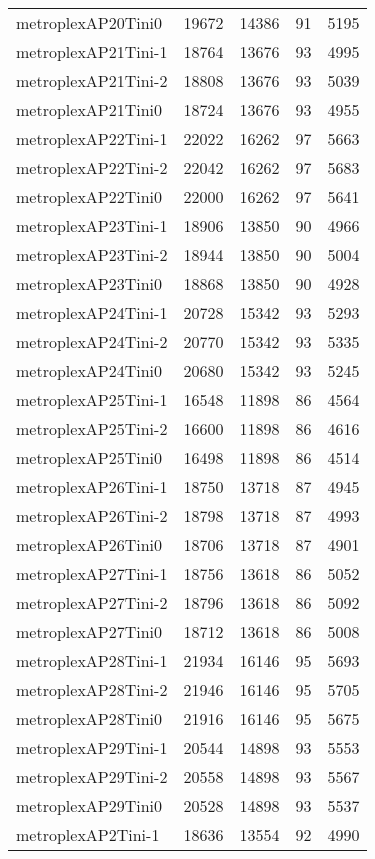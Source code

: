 \begin{tabular}{lrrrr}
metroplexAP20Tini0 & 19672 & 14386 & 91 & 5195 \\
metroplexAP21Tini-1 & 18764 & 13676 & 93 & 4995 \\
metroplexAP21Tini-2 & 18808 & 13676 & 93 & 5039 \\
metroplexAP21Tini0 & 18724 & 13676 & 93 & 4955 \\
metroplexAP22Tini-1 & 22022 & 16262 & 97 & 5663 \\
metroplexAP22Tini-2 & 22042 & 16262 & 97 & 5683 \\
metroplexAP22Tini0 & 22000 & 16262 & 97 & 5641 \\
metroplexAP23Tini-1 & 18906 & 13850 & 90 & 4966 \\
metroplexAP23Tini-2 & 18944 & 13850 & 90 & 5004 \\
metroplexAP23Tini0 & 18868 & 13850 & 90 & 4928 \\
metroplexAP24Tini-1 & 20728 & 15342 & 93 & 5293 \\
metroplexAP24Tini-2 & 20770 & 15342 & 93 & 5335 \\
metroplexAP24Tini0 & 20680 & 15342 & 93 & 5245 \\
metroplexAP25Tini-1 & 16548 & 11898 & 86 & 4564 \\
metroplexAP25Tini-2 & 16600 & 11898 & 86 & 4616 \\
metroplexAP25Tini0 & 16498 & 11898 & 86 & 4514 \\
metroplexAP26Tini-1 & 18750 & 13718 & 87 & 4945 \\
metroplexAP26Tini-2 & 18798 & 13718 & 87 & 4993 \\
metroplexAP26Tini0 & 18706 & 13718 & 87 & 4901 \\
metroplexAP27Tini-1 & 18756 & 13618 & 86 & 5052 \\
metroplexAP27Tini-2 & 18796 & 13618 & 86 & 5092 \\
metroplexAP27Tini0 & 18712 & 13618 & 86 & 5008 \\
metroplexAP28Tini-1 & 21934 & 16146 & 95 & 5693 \\
metroplexAP28Tini-2 & 21946 & 16146 & 95 & 5705 \\
metroplexAP28Tini0 & 21916 & 16146 & 95 & 5675 \\
metroplexAP29Tini-1 & 20544 & 14898 & 93 & 5553 \\
metroplexAP29Tini-2 & 20558 & 14898 & 93 & 5567 \\
metroplexAP29Tini0 & 20528 & 14898 & 93 & 5537 \\
metroplexAP2Tini-1 & 18636 & 13554 & 92 & 4990 \\

\end{tabular}
